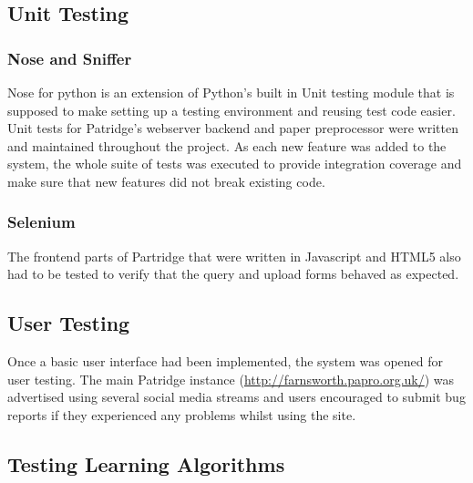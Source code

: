 %  
%

\subsection{ Unit Testing }

\subsubsection{ Nose and Sniffer }

Nose for python is an extension of Python's built in Unit testing module that
is supposed to make setting up a testing environment and reusing test code
easier. Unit tests for Patridge's webserver backend and paper preprocessor were
written and maintained throughout the project. As each new feature was added to
the system, the whole suite of tests was executed to provide integration
coverage and make sure that new features did not break existing code. 

\subsubsection{ Selenium }

The frontend parts of Partridge that were written in Javascript and HTML5 also
had to be tested to verify that the query and upload forms behaved as expected.


\subsection{ User Testing } 

Once a basic user interface had been implemented, the system was opened for
user testing. The main Patridge instance
(\url{http://farnsworth.papro.org.uk/}) was advertised using several social
media streams and users encouraged to submit bug reports if they experienced
any problems whilst using the site.


\subsection{ Testing Learning Algorithms }

